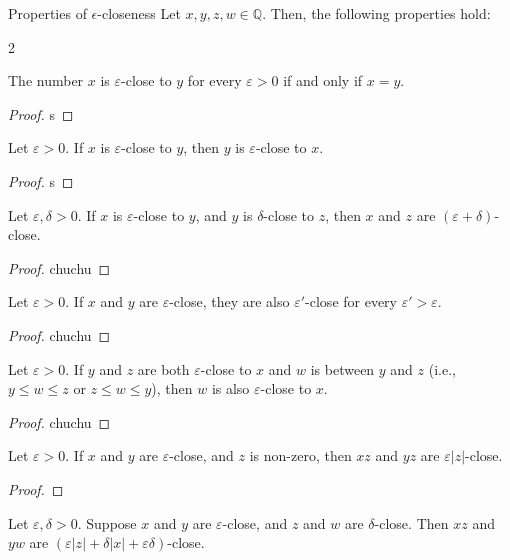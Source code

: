 \begin{problem}{Properties of $\epsilon$-closeness}
Let $x, y, z, w \in \mathbb{Q}$. Then, the following properties hold:
\end{problem}
\begin{multicols}{2}
\begin{proposition}
    The number $x$ is $\varepsilon$-close to $y$ for every $\varepsilon > 0$ if and only if  $x = y$.
\end{proposition} 
\begin{proof}
    s
\end{proof}

\begin{proposition}
    Let $\varepsilon > 0.$ 
    If $x$ is $\varepsilon$-close to $y$, then $y$ is $\varepsilon$-close to $x$.
\end{proposition}
\begin{proof}
    s
\end{proof}

\begin{proposition}
    Let $\varepsilon, \delta > 0.$ If $x$ is $\varepsilon$-close to $y$, and $y$ is $\delta$-close to $z$, then $x$ and $z$ are $(\varepsilon + \delta)$-close. 
\end{proposition}
\begin{proof}
    chuchu
\end{proof}

\begin{proposition}
    Let $\varepsilon > 0.$ If $x$ and $y$ are $\varepsilon$-close, they are also $\varepsilon'$-close for every $\varepsilon' > \varepsilon$.
\end{proposition}
\begin{proof}
    chuchu
\end{proof}

\begin{proposition}
    Let $\varepsilon > 0.$ If $y$ and $z$ are both $\varepsilon$-close to $x$ and $w$ is between $y$ and $z$ (i.e., $y \leq w \leq z$ or $z \leq w \leq y$), then $w$ is also $\varepsilon$-close to $x$.
\end{proposition}
\begin{proof}
    chuchu
\end{proof}

\begin{proposition}
    Let $\varepsilon > 0.$ If $x$ and $y$ are $\varepsilon$-close, and $z$ is non-zero, then $xz$ and $yz$ are $\varepsilon \lvert z \rvert$-close.
\end{proposition}
\begin{proof}
    
\end{proof}

\begin{proposition}
    Let $\varepsilon, \delta > 0.$ Suppose $x$ and $y$ are $\varepsilon$-close, and $z$ and $w$ are $\delta$-close. Then $xz$ and $yw$ are $(\varepsilon \lvert z \rvert + \delta \lvert x \rvert + \varepsilon \delta)$-close.
\end{proposition}
\end{multicols}

